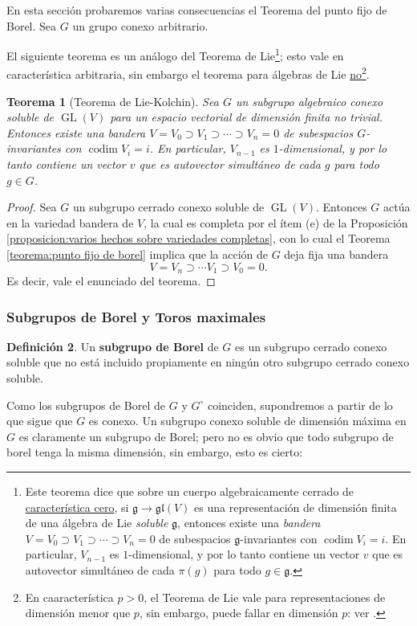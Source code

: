 \documentclass[spanish,10pt]{amsart}
\newtheorem{theorem}{Teorema}[section]
\theoremstyle{definition}
\newtheorem{definition}[theorem]{Definición}
\theoremstyle{remark}
\numberwithin{equation}{section}
\begin{document}
En esta sección probaremos varias consecuencias el Teorema del punto fijo de Borel. Sea $G$ un grupo conexo arbitrario.

El siguiente teorema es un análogo del Teorema de Lie\footnote{Este teorema dice que sobre un cuerpo algebraicamente cerrado de \underline{característica cero}, si $\mathfrak g \to \mathfrak {gl} (V)$ es una representación de dimensión finita de una álgebra de Lie \textit{soluble} $\mathfrak g$, entonces existe una \textit{bandera} $V = V_0 \supset V_1 \supset \cdots \supset V_n = 0$ de subespacios $\mathfrak g$-invariantes con $\operatorname{codim} V_i = i$. En particular, $V_{n-1}$ es $1$-dimensional, y por lo tanto contiene un vector $v$ que es autovector simultáneo de cada $\pi (g)$ para todo $g \in \mathfrak g$.}; esto vale en característica arbitraria, sin embargo el teorema para álgebras de Lie \underline{no}\footnote{En caaracterística $p > 0$, el Teorema de Lie vale para representaciones de dimensión menor que $p$, sin embargo, puede fallar en dimensión $p$: ver \cite{wikipedia-lie-theorem}.}.
\begin{theorem}[Teorema de Lie-Kolchin]\label{teorema:Lie-Kolchin}
Sea $G$ un subgrupo algebraico conexo soluble de $\operatorname{GL} (V)$ para un espacio vectorial de dimensión finita no trivial. Entonces existe una bandera $V = V_0 \supset V_1 \supset \cdots \supset V_n = 0$ de subespacios $G$-invariantes con $\operatorname{codim} V_i = i$. En particular, $V_{n-1}$ es $1$-dimensional, y por lo tanto contiene un vector $v$ que es autovector simultáneo de cada $g$ para todo $g \in G$.
\end{theorem}
\begin{proof}
Sea $G$ un subgrupo cerrado conexo soluble de $\operatorname{GL} (V)$. Entonces $G$ actúa en la variedad bandera de $V$, la cual es completa por el ítem (e) de la Proposición \ref{proposicion:varios hechos sobre variedades completas}, con lo cual el Teorema \ref{teorema:punto fijo de borel} implica que la acción de $G$ deja fija una bandera
\[
    V = V_n \supset \cdots V_1 \supset V_0 = 0.
\]
Es decir, vale el enunciado del teorema.
\end{proof}

\subsubsection{Subgrupos de Borel y Toros maximales}

\begin{definition}
Un \textbf{subgrupo de Borel} de $G$ es un subgrupo cerrado conexo soluble que no está incluido propiamente en ningún otro subgrupo cerrado conexo soluble.
\end{definition}
Como los subgrupos de Borel de $G$ y $G^{\circ}$ coinciden, supondremos a partir de lo que sigue que $G$ es conexo. Un subgrupo conexo soluble de dimensión máxima en $G$ es claramente un subgrupo de Borel; pero no es obvio que todo subgrupo de borel tenga la misma dimensión, sin embargo, esto es cierto:
\end{document}
